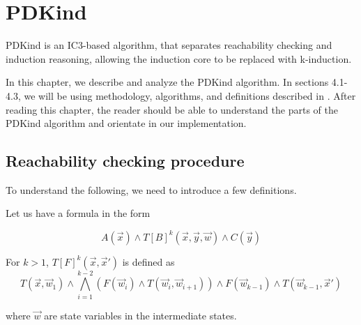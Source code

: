 \chapter{PDKind}

\noindent PDKind is an IC3\cite{6148908}-based algorithm, that separates reachability checking and induction reasoning, allowing the induction core to be replaced with k-induction.

In this chapter, we describe and analyze the PDKind algorithm. In sections 4.1-4.3, we will be using methodology, algorithms, and definitions described in \cite{7886665}.
After reading this chapter, the reader should be able to understand the parts of the PDKind algorithm and orientate in our implementation.




\section{Reachability checking procedure}\label{ReachabilityChecking}

\noindent To understand the following, we need to introduce a few definitions.

\vspace{\baselineskip}\noindent Let us have a formula in the form

\begin{equation}
    A(\vec{x}) \wedge T[B]^k(\vec{x},\vec{y},\vec{w}) \wedge C(\vec{y})
\end{equation}

\vspace{\baselineskip}\begin{definition}
                          For \( k > 1 \), \( T[F]^k(\vec{x}, \vec{x}') \) is defined as
                          \begin{equation*}
                              T(\vec{x}, \vec{w}_1) \land \bigwedge_{i=1}^{k-2} \left( F(\vec{w}_i) \land T(\vec{w}_i, \vec{w}_{i+1}) \right) \land F(\vec{w}_{k-1}) \land T(\vec{w}_{k-1}, \vec{x}')
                          \end{equation*}

                          \noindent where $\vec{w}$ are state variables in the intermediate states.
\end{definition}


